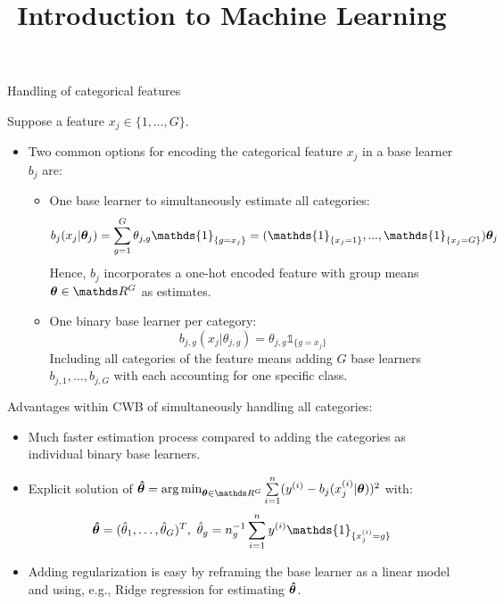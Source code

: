 \documentclass[11pt,compress,t,notes=noshow, xcolor=table]{beamer}
\title{Introduction to Machine Learning}
\date{}
\begin{document}


\begin{vbframe}{Handling of categorical features}

Suppose a feature $x_j \in \{1, \dots, G\}$.
\begin{itemize}
  \item Two common options for encoding the categorical feature $x_j$ in a base learner $b_j$ are:
  \begin{itemize}
    \item 
        One base learner to simultaneously estimate all categories: 
        $$b_j(x_j | \thetab_j) = \sum_{g=1}^G \theta_{j,g}\mathds{1}_{\{g = x_j\}} = (\mathds{1}_{\{x_j = 1\}}, ..., \mathds{1}_{\{x_j = G\}}) \thetab_j$$
        Hence, $b_j$ incorporates a one-hot encoded feature with group means $\thetab\in\R^G$ as estimates. 
    
    \item 
        One binary base learner per category:
        $$b_{j,g}(x_j | \theta_{j,g}) = \theta_{j,g}\mathds{1}_{\{g = x_j\}}$$  
        Including all categories of the feature means adding $G$ base learners $b_{j,1}, \dots, b_{j,G}$ with each accounting for one specific class.
  \end{itemize}
\end{itemize}

\framebreak

Advantages within CWB of simultaneously handling all categories: 
\begin{itemize}
    \item 
        Much faster estimation process compared to adding the categories as individual binary base learners.

    \item 
        Explicit solution of $\thetabh = \argmin_{\thetab\in\R^G}\sumin (\yi - b_j(x^{(i)}_j | \thetab))^2$ with:
        $$\thetabh = (\thetah_1, \dots, \thetah_G)^T,\ \thetah_g = n_g^{-1}\sumin \yi \mathds{1}_{\{x^{(i)}_j = g\}}$$

    \item 
        Adding regularization is easy by reframing the base learner as a linear model and using, e.g., Ridge regression for estimating $\bm{\hat\theta}$.  
\end{itemize}


\end{vbframe}
\end{document}
